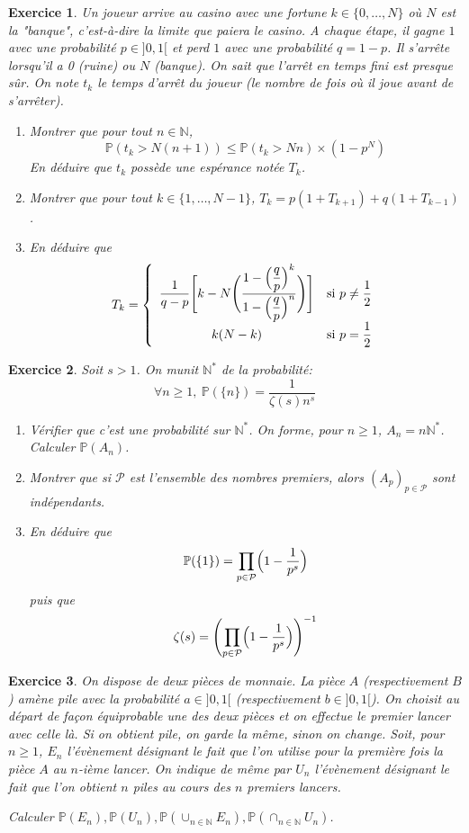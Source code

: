 \documentclass[12pt]{article}
\newtheorem{exercise}{Exercice}[section]
\theoremstyle{remark}
\theoremstyle{remark}
\newcommand{\N}{\mathbb{N}} \newcommand{\Z}{\mathbb{Z}}
\renewcommand{\P}{\mathbb{P}} \newcommand{\im}{\emph{Im}}
\begin{document}
\begin{exercise}
	Un joueur arrive au casino avec une fortune $k\in\{0,\dots,N\}$ où $N$ est la
	"banque", c'est-à-dire la limite que paiera le casino. A chaque étape, il
	gagne $1$ avec une probabilité $p\in]0,1[$ et perd $1$ avec une probabilité
	$q=1-p$. Il s'arrête lorsqu'il a 0 (ruine) ou $N$ (banque). On sait que
	l'arrêt en temps fini est presque sûr. On note $t_{k}$ le temps d'arrêt du
	joueur (le nombre de fois où il joue avant de s'arrêter).
	\begin{enumerate}
		\item
		Montrer que pour tout $n\in\N$,
		$$\P(t_{k}>N(n+1))\leqslant\P(t_{k}>Nn)\times(1-p^{N})$$ En déduire que
		$t_{k}$ possède une espérance notée $T_{k}$.
		\item
		Montrer que pour tout $k\in\{1,\dots,N-1\}$,
		$T_{k}=p(1+T_{k+1})+q(1+T_{k-1})$.
		\item
		En déduire que 
		$$T_{k}= \left\{
			\begin{array}[]{cc}
				\dfrac{1}{q-p}\Biggl[k-N\Biggl(\dfrac{1-\Bigl(\dfrac{q}{p}\Bigr)^{k}}{1-\Bigl(\dfrac{q}{p}\Bigr)^{n}}\Biggr)\Biggr]
& \text{si }p\neq\dfrac{1}{2}\\
				k(N-k) & \text{si }p=\dfrac{1}{2}
			\end{array}
		\right.$$
	\end{enumerate}
\end{exercise}

\begin{exercise}
	Soit $s>1$. On munit $\N^{*}$ de la probabilité:
	$$\forall n\geqslant1,~\P(\{n\})=\frac{1}{\zeta(s)n^{s}}$$
	\begin{enumerate}
		\item
		Vérifier que c'est une probabilité sur $\N^{*}$. On forme, pour
		$n\geqslant 1$, $A_{n}=n\N^{*}$. Calculer $\P(A_{n})$.
		\item
		Montrer que si $\mathcal{P}$ est l'ensemble des nombres premiers, alors
		$(A_{p})_{p\in\mathcal{P}}$ sont indépendants.
		\item
		En déduire que 
		$$\P(\{1\})=\prod_{p\in\mathcal{P}}\Bigl(1-\frac{1}{p^{s}}\Bigr)$$ puis
		que 
		$$\zeta(s)=\Biggl(\prod_{p\in\mathcal{P}}\Bigl(1-\frac{1}{p^{s}}\Bigr)\Biggr)^{-1}$$
	\end{enumerate}
\end{exercise}

\begin{exercise}
	On dispose de deux pièces de monnaie. La pièce $A$ (respectivement $B$) amène
	pile avec la probabilité $a\in]0,1[$ (respectivement $b\in]0,1[$). On choisit
	au départ de façon équiprobable une des deux pièces et on effectue le premier
	lancer avec celle là. Si on obtient pile, on garde la même, sinon on change.
	Soit, pour $n\geqslant1$, $E_{n}$ l'évènement désignant le fait que l'on
	utilise pour la première fois la pièce $A$ au $n$-ième lancer. On indique de
	même par $U_{n}$ l'évènement désignant le fait que l'on obtient $n$ piles au
	cours des $n$ premiers lancers.

	Calculer $\P(E_{n}),\P(U_{n}),\P(\cup_{n\in\N}E_{n}),\P(\cap_{n\in\N}U_{n})$.
\end{exercise}
\end{document}
